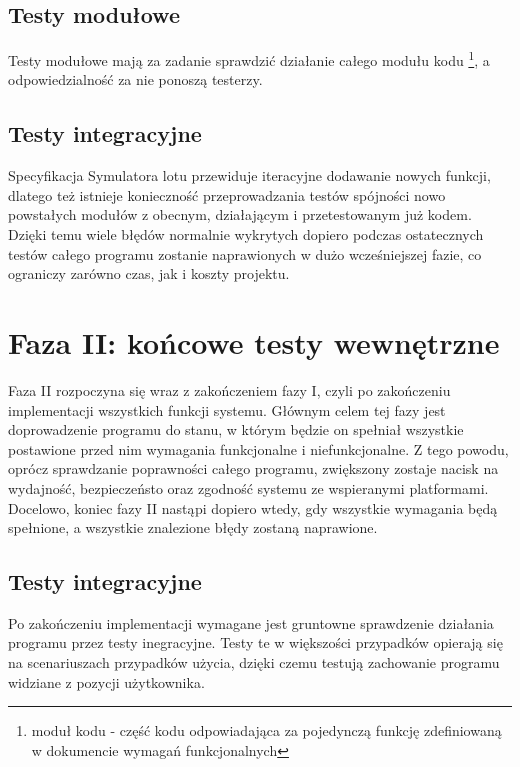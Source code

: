 \documentclass{mwrep}
\begin{document}
\section{Testy modułowe}
Testy modułowe mają za zadanie sprawdzić działanie całego modułu kodu \footnote{moduł kodu - część kodu odpowiadająca za pojedynczą funkcję zdefiniowaną w dokumencie wymagań funkcjonalnych}, a odpowiedzialność za nie ponoszą testerzy.

\section{Testy integracyjne}
Specyfikacja Symulatora lotu przewiduje iteracyjne dodawanie nowych funkcji, dlatego też istnieje konieczność przeprowadzania testów spójności nowo powstałych modułów z obecnym, działającym i przetestowanym już kodem. Dzięki temu wiele błędów normalnie wykrytych dopiero podczas ostatecznych testów całego programu zostanie naprawionych w dużo wcześniejszej fazie, co ograniczy zarówno czas, jak i koszty projektu.

\chapter{Faza II: końcowe testy wewnętrzne}
Faza II rozpoczyna się wraz z zakończeniem fazy I, czyli po zakończeniu implementacji wszystkich funkcji systemu. Głównym celem tej fazy jest doprowadzenie programu do stanu, w którym będzie on spełniał wszystkie postawione przed nim wymagania funkcjonalne i niefunkcjonalne. Z tego powodu, oprócz sprawdzanie poprawności całego programu, zwiększony zostaje nacisk na wydajność, bezpieczeństo oraz zgodność systemu ze wspieranymi platformami. Docelowo, koniec fazy II nastąpi dopiero wtedy, gdy wszystkie wymagania będą spełnione, a wszystkie znalezione błędy zostaną naprawione.

\section{Testy integracyjne}
Po zakończeniu implementacji wymagane jest gruntowne sprawdzenie działania programu przez testy inegracyjne. Testy te w większości przypadków opierają się na scenariuszach przypadków użycia, dzięki czemu testują zachowanie programu widziane z pozycji użytkownika.
\end{document}
